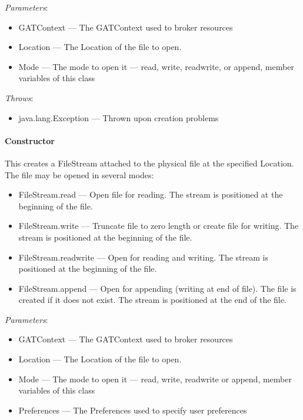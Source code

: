 \documentclass[$Date: 2003/06/26 19:29:31 $]{glabarticle}
\begin{document}
\textit{Parameters}:
\begin{itemize}
\item[] GATContext --- The GATContext used to broker resources
\item[] Location --- The Location of the file to open.
\item[] Mode --- The mode to open it --- read, write, readwrite, or append, member variables of this class
\end{itemize}

 \textit{Throws}:
 \begin{itemize}
 \item[] java.lang.Exception --- Thrown upon creation problems 
 \end{itemize}

\paragraph{Constructor}

This creates a FileStream attached to the physical file at the
specified Location.  The file may be opened in several modes:

\begin{itemize}

\item[] FileStream.read --- Open file for reading.  The stream is
positioned at the beginning of the file.

\item[] FileStream.write --- Truncate file to zero length or create file
for writing.  The stream is positioned at the beginning of the file.

\item[] FileStream.readwrite --- Open for reading and writing.  The
stream is positioned at the beginning of the file.

\item[] FileStream.append --- Open for appending (writing at end of
file).  The file is created if it does not exist.  The stream is
positioned at the end of the file.\\

\end{itemize}

\textit{Parameters}:
\begin{itemize}
\item[] GATContext --- The GATContext used to broker resources
\item[] Location --- The Location of the file to open.
\item[] Mode --- The mode to open it --- read, write, readwrite or append, member variables of this class
\item[] Preferences --- The Preferences used to specify user preferences
\end{itemize}
\end{document}
